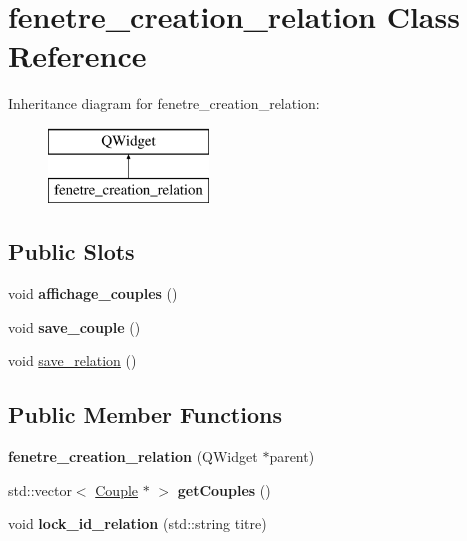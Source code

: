 \hypertarget{classfenetre__creation__relation}{}\section{fenetre\+\_\+creation\+\_\+relation Class Reference}
\label{classfenetre__creation__relation}
Inheritance diagram for fenetre\+\_\+creation\+\_\+relation\+:\begin{figure}[H]
\begin{center}
\leavevmode
\includegraphics[height=2.000000cm]{classfenetre__creation__relation}
\end{center}
\end{figure}
\subsection*{Public Slots}
\begin{DoxyCompactItemize}
\item 
\mbox{\label{classfenetre__creation__relation_ac5b715961f109f3bb403d8ca37faed71}} 
void {\bfseries affichage\+\_\+couples} ()
\item 
\mbox{\label{classfenetre__creation__relation_ad8b233b34d0e2775108683e09a8d966d}} 
void {\bfseries save\+\_\+couple} ()
\item 
void \hyperlink{classfenetre__creation__relation_af9891e79cff26ef704cfdae9cfa46752}{save\+\_\+relation} ()
\end{DoxyCompactItemize}
\subsection*{Public Member Functions}
\begin{DoxyCompactItemize}
\item 
\mbox{\label{classfenetre__creation__relation_ae7f98f1b23dbe45b922b61293348a07f}} 
{\bfseries fenetre\+\_\+creation\+\_\+relation} (Q\+Widget $\ast$parent)
\item 
\mbox{\label{classfenetre__creation__relation_a843417e0a1f6350f8a3919eb92cf67dd}} 
std\+::vector$<$ \hyperlink{class_couple}{Couple} $\ast$ $>$ {\bfseries get\+Couples} ()
\item 
\mbox{\label{classfenetre__creation__relation_a83c62031d4d8d973aca33e38d9079c49}} 
void {\bfseries lock\+\_\+id\+\_\+relation} (std\+::string titre)
\end{DoxyCompactItemize}


